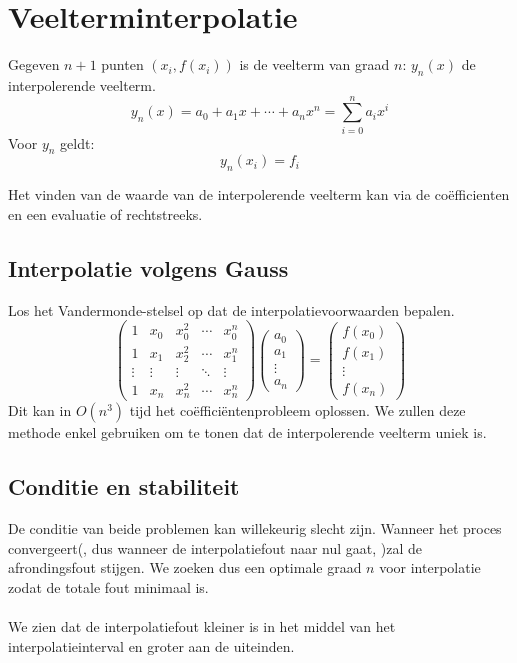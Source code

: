 \documentclass[samenvatting.tex]{subfiles}
\begin{document}
\chapter{Veelterminterpolatie}
\begin{defi}
Gegeven $n+1$ punten $(x_i,f(x_i))$ is de veelterm van graad $n$: $y_n(x)$ de interpolerende veelterm.
\[
y_n(x) = a_0 + a_1x+ \cdots + a_nx^n = \sum_{i=0}^na_ix^i
\]
Voor $y_n$ geldt:
\[
y_n(x_i) = f_i
\]
\end{defi}
Het vinden van de waarde van de interpolerende veelterm kan via de co\"efficienten en een evaluatie of rechtstreeks.

\section{Interpolatie volgens Gauss}
Los het Vandermonde-stelsel op dat de interpolatievoorwaarden bepalen.
\[
\begin{pmatrix}
1 & x_0 & x_0^2 & \cdots & x_{0}^{n}\\
1 & x_1 & x_2^2 & \cdots & x_{1}^{n}\\
\vdots & \vdots & \vdots & \ddots &\vdots\\
1 & x_n & x_n^2 & \cdots & x_{n}^{n}
\end{pmatrix}
\begin{pmatrix}
a_0\\a_1\\\vdots\\a_n
\end{pmatrix}
=
\begin{pmatrix}
f(x_0)\\f(x_1)\\\vdots\\f(x_n)
\end{pmatrix}
\]
Dit kan in $O(n^3)$ tijd het co\"effici\"entenprobleem oplossen. We zullen deze methode enkel gebruiken om te tonen dat de interpolerende veelterm uniek is.

\section{Conditie en stabiliteit}
De conditie van beide problemen kan willekeurig slecht zijn. Wanneer het proces convergeert(, dus wanneer de interpolatiefout naar nul gaat, )zal de afrondingsfout stijgen. We zoeken dus een optimale graad $n$ voor interpolatie zodat de totale fout minimaal is.\\\\
We zien dat de interpolatiefout kleiner is in het middel van het interpolatieinterval en groter aan de uiteinden.
\end{document}
